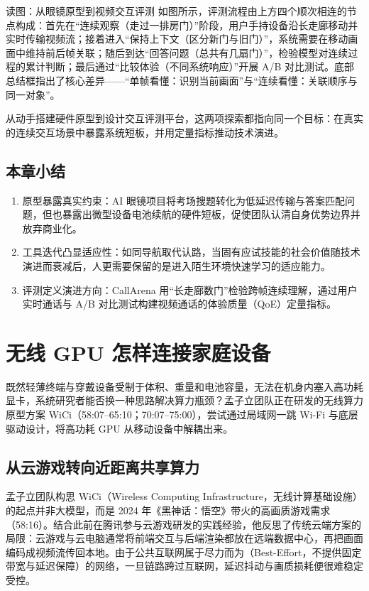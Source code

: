 \documentclass[UTF8,a4paper,11pt,fontset=fandol]{ctexart}
\begin{document}
\begin{knowledgebox}{读图：从眼镜原型到视频交互评测}
如图所示，评测流程由上方四个顺次相连的节点构成：首先在“连续观察（走过一排房门）”阶段，用户手持设备沿长走廊移动并实时传输视频流；接着进入“保持上下文（区分新门与旧门）”，系统需要在移动画面中维持前后帧关联；随后到达“回答问题（总共有几扇门）”，检验模型对连续过程的累计判断；最后通过“比较体验（不同系统响应）”开展 A/B 对比测试。底部总结框指出了核心差异——“单帧看懂：识别当前画面”与“连续看懂：关联顺序与同一对象”。
\end{knowledgebox}
从动手搭建硬件原型到设计交互评测平台，这两项探索都指向同一个目标：在真实的连续交互场景中暴露系统短板，并用定量指标推动技术演进。
\subsection{本章小结}
\begin{enumerate}
\item 原型暴露真实约束：AI 眼镜项目将考场搜题转化为低延迟传输与答案匹配问题，但也暴露出微型设备电池续航的硬件短板，促使团队认清自身优势边界并放弃商业化。
\item 工具迭代凸显适应性：如同导航取代认路，当固有应试技能的社会价值随技术演进而衰减后，人更需要保留的是进入陌生环境快速学习的适应能力。
\item 评测定义演进方向：CallArena 用“长走廊数门”检验跨帧连续理解，通过用户实时通话与 A/B 对比测试构建视频通话的体验质量（QoE）定量指标。
\end{enumerate}
\section{无线 GPU 怎样连接家庭设备}
既然轻薄终端与穿戴设备受制于体积、重量和电池容量，无法在机身内塞入高功耗显卡，系统研究者能否换一种思路解决算力瓶颈？孟子立团队正在研发的无线算力原型方案 WiCi（58:07–65:10；70:07–75:00），尝试通过局域网一跳 Wi-Fi 与底层驱动设计，将高功耗 GPU 从移动设备中解耦出来。
\subsection{从云游戏转向近距离共享算力}
孟子立团队构思 WiCi（Wireless Computing Infrastructure，无线计算基础设施）的起点并非大模型，而是 2024 年《黑神话：悟空》带火的高画质游戏需求（58:16）。结合此前在腾讯参与云游戏研发的实践经验，他反思了传统云端方案的局限：云游戏与云电脑通常将前端交互与后端渲染都放在远端数据中心，再把画面编码成视频流传回本地。由于公共互联网属于尽力而为（Best-Effort，不提供固定带宽与延迟保障）的网络，一旦链路跨过互联网，延迟抖动与画质损耗便很难稳定受控。
\end{document}
